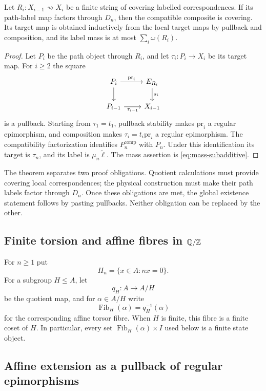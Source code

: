 \begin{theorem}\label{thm:compatible-covering}
Let $R_i:X_{i-1}\rightsquigarrow X_i$ be a finite string of covering labelled correspondences.  If its path-label map factors through $D_n$, then the compatible composite is covering.  Its target map is obtained inductively from the local target maps by pullback and composition, and its label mass is at most $\sum_i\omega(R_i)$.
\end{theorem}

\begin{proof}
Let $P_i$ be the path object through $R_i$, and let $\tau_i:P_i\to X_i$ be its target map.  For $i\ge2$ the square
\[
\begin{tikzcd}
P_i \arrow[r,"{\mathrm{pr}_i}"] \arrow[d]
  & E_{R_i} \arrow[d,"{s_i}"]\\
P_{i-1} \arrow[r,"{\tau_{i-1}}"'] & X_{i-1}
\end{tikzcd}
\]
is a pullback.  Starting from $\tau_1=t_1$, pullback stability makes $\mathrm{pr}_i$ a regular epimorphism, and composition makes $\tau_i=t_i\mathrm{pr}_i$ a regular epimorphism.  The compatibility factorization identifies $P_n^{\mathrm{comp}}$ with $P_n$.  Under this identification its target is $\tau_n$, and its label is $\mu_n\widetilde\ell$.  The mass assertion is \eqref{eq:mass-subadditive}.
\end{proof}

The theorem separates two proof obligations.  Quotient calculations must provide covering local correspondences; the physical construction must make their path labels factor through $D_n$.  Once these obligations are met, the global existence statement follows by pasting pullbacks.  Neither obligation can be replaced by the other.

\subsection{Finite torsion and affine fibres in \texorpdfstring{$\mathbb Q/\mathbb Z$}{Q/Z}}

For $n\ge1$ put
\[
H_n=\{x\in A:nx=0\}.
\]
For a subgroup $H\le A$, let
\[
q_H:A\longrightarrow A/H
\]
be the quotient map, and for $\alpha\in A/H$ write
\[
\operatorname{Fib}_H(\alpha)=q_H^{-1}(\alpha)
\]
for the corresponding affine torsor fibre.  When $H$ is finite, this fibre is a finite coset of $H$.  In particular, every set $\operatorname{Fib}_H(\alpha)\times I$ used below is a finite state object.

\subsection{Affine extension as a pullback of regular epimorphisms}

